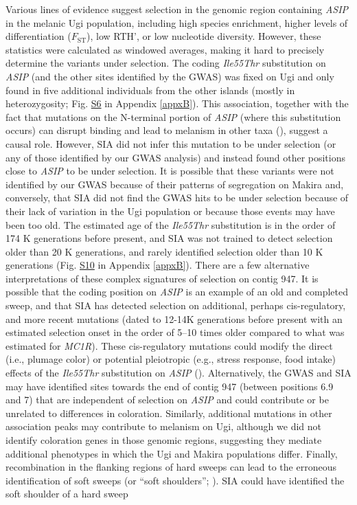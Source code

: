 Various lines of evidence suggest selection in the genomic region containing \textit{ASIP} in the melanic Ugi population, including high species enrichment, higher levels of differentiation ($F_{\mathrm{ST}}$), low \acs{RTH}’, or low nucleotide diversity. However, these statistics were calculated as windowed averages, making it hard to precisely determine the variants under selection. The coding \textit{Ile55Thr} substitution on \textit{ASIP} (and the other sites identified by the \acs{GWAS}) was fixed on Ugi and only found in five additional individuals from the other islands (mostly in heterozygosity; Fig. \href{https://journals.plos.org/PLOSGENETICS/article?id=10.1371/journal.pgen.1010474#sec017}{S6} in Appendix \ref{appxB}). This association, together with the fact that mutations on the N-terminal portion of \textit{ASIP} (where this substitution occurs) can disrupt binding and lead to melanism in other taxa (\cite{hiragaki2008recessive,kingsley2009melanism}), suggest a causal role. However, \ac{SIA} did not infer this mutation to be under selection (or any of those identified by our \acs{GWAS} analysis) and instead found other positions close to \textit{ASIP} to be under selection. It is possible that these variants were not identified by our \acs{GWAS} because of their patterns of segregation on Makira and, conversely, that \ac{SIA} did not find the \acs{GWAS} hits to be under selection because of their lack of variation in the Ugi population or because those events may have been too old. The estimated age of the \textit{Ile55Thr} substitution is in the order of 174 K generations before present, and SIA was not trained to detect selection older than 20 K generations, and rarely identified selection older than 10 K generations (Fig. \href{https://journals.plos.org/PLOSGENETICS/article?id=10.1371/journal.pgen.1010474#sec017}{S10} in Appendix \ref{appxB}). There are a few alternative interpretations of these complex signatures of selection on contig 947. It is possible that the coding position on \textit{ASIP} is an example of an old and completed sweep, and that \ac{SIA} has detected selection on additional, perhaps cis-regulatory, and more recent mutations (dated to 12-14K generations before present with an estimated selection onset in the order of 5–10 times older compared to what was estimated for \textit{MC1R}). These cis-regulatory mutations could modify the direct (i.e., plumage color) or potential pleiotropic (e.g., stress response, food intake) effects of the \textit{Ile55Thr} substitution on \textit{ASIP} (\cite{ducrest2008pleiotropy}). Alternatively, the \acs{GWAS} and \ac{SIA} may have identified sites towards the end of contig 947 (between positions 6.9 and 7) that are independent of selection on \textit{ASIP} and could contribute or be unrelated to differences in coloration. Similarly, additional mutations in other association peaks may contribute to melanism on Ugi, although we did not identify coloration genes in those genomic regions, suggesting they mediate additional phenotypes in which the Ugi and Makira populations differ. Finally, recombination in the flanking regions of hard sweeps can lead to the erroneous identification of soft sweeps (or “soft shoulders”; \cite{schrider2015soft}). \ac{SIA} could have identified the soft shoulder of a hard sweep 